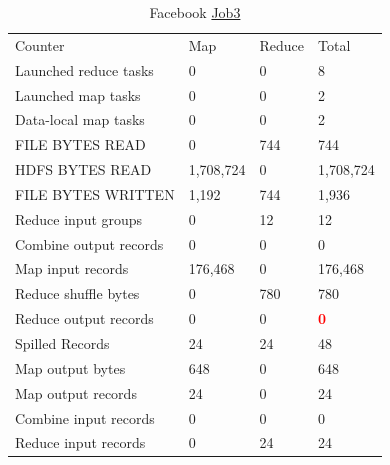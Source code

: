\documentclass[paper=a4, fontsize=11pt]{scrartcl}	%
\numberwithin{equation}{section}															%
\numberwithin{figure}{section}																%
\numberwithin{table}{section}																%
\begin{document}
\begin{table}[!h]
	\centering
	\caption{Facebook \href{http://hadoop-compute0.di.univr.it:50030/jobdetails.jsp?jobid=job_201603141010_12303}{Job3}}
	\label{my-label}
	\begin{tabular}{llll}
		Counter&	Map&	Reduce&	Total\\
		Launched reduce tasks&	0&	0&	8\\
		Launched map tasks&	0&	0&	2\\
		Data-local map tasks&	0&	0&	2\\
		FILE BYTES READ&	0&	744&	744\\
		HDFS BYTES READ&	1,708,724&	0&	1,708,724\\
		FILE BYTES WRITTEN&	1,192&	744&	1,936\\
		Reduce input groups&	0&	12&	12\\
		Combine output records&	0&	0&	0\\
		Map input records&	176,468&	0&	176,468\\
		Reduce shuffle bytes&	0&	780&	780\\
		Reduce output records&	0&	0&	\textbf{\textcolor{red}{0}}\\
		Spilled Records&	24&	24&	48\\
		Map output bytes&	648&	0&	648\\
		Map output records&	24&	0&	24\\
		Combine input records&	0&	0&	0\\
		Reduce input records&	0&	24&	24\\
	\end{tabular}
\end{table}
\end{document}
